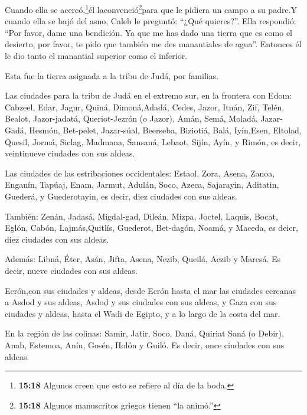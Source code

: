  Cuando ella se acercó,\footnote{\textbf{15:18} Algunos
  creen que esto se refiere al día de la boda.}él
laconvenció\footnote{\textbf{15:18} Algunos manuscritos griegos tienen
  ``la animó.''}para que le pidiera un campo a su padre.Y cuando ella se
bajó del asno, Caleb le preguntó: ``¿Qué quieres?''.  Ella
respondió: ``Por favor, dame una bendición. Ya que me has dado una
tierra que es como el desierto, por favor, te pido que también me des
manantiales de agua''. Entonces él le dio tanto el manantial superior
como el inferior.

 Esta fue la tierra asignada a la tribu de Judá, por
familias.

 Las ciudades para la tribu de Judá en el extremo sur, en
la frontera con Edom: Cabzeel, Edar, Jagur,  Quiná,
Dimoná,Adadá,  Cedes, Jazor, Itnán,  Zif,
Telén, Bealot,  Jazor-jadatá, Queriot-Jezrón (o Jazor),
 Amán, Semá, Moladá,  Jazar-Gadá, Hesmón,
Bet-pelet,  Jazar-súal, Beerseba, Biziotiá, 
Balá, Iyín,Esen,  Eltolad, Quesil, Jormá, 
Siclag, Madmana, Sansaná,  Lebaot, Sijín, Ayín, y Rimón, es
decir, veintinueve ciudades con sus aldeas.

 Las ciudades de las estribaciones occidentales: Estaol,
Zora, Asena,  Zanoa, Enganín, Tapúaj, Enam, 
Jarmut, Adulán, Soco, Azeca,  Sajarayin, Aditatin, Guederá,
y Guederotayin, es decir, diez ciudades con sus aldeas.

 También: Zenán, Jadasá, Migdal-gad,  Dileán,
Mizpa, Joctel,  Laquis, Bocat, Eglón,  Cabón,
Lajmás,Quitlís,  Guederot, Bet-dagón, Noamá, y Maceda, es
deicr, diez ciudades con sus aldeas.

 Además: Libná, Éter, Asán,  Jifta, Asena,
Nezib,  Queilá, Aczib y Maresá. Es decir, nueve ciudades
con sus aldeas.

 Ecrón,con sus ciudades y aldeas,  desde Ecrón
hasta el mar las ciudades cercanas a Asdod y sus aldeas, 
Asdod y sus ciudades con sus aldeas, y Gaza con sus ciudades y aldeas,
hasta el Wadi de Egipto, y a lo largo de la costa del mar.

 En la región de las colinas: Samir, Jatir, Soco,
 Daná, Quiriat Saná (o Debir),  Anab, Estemoa,
Anín,  Gosén, Holón y Guiló. Es decir, once ciudades con
sus aldeas.

